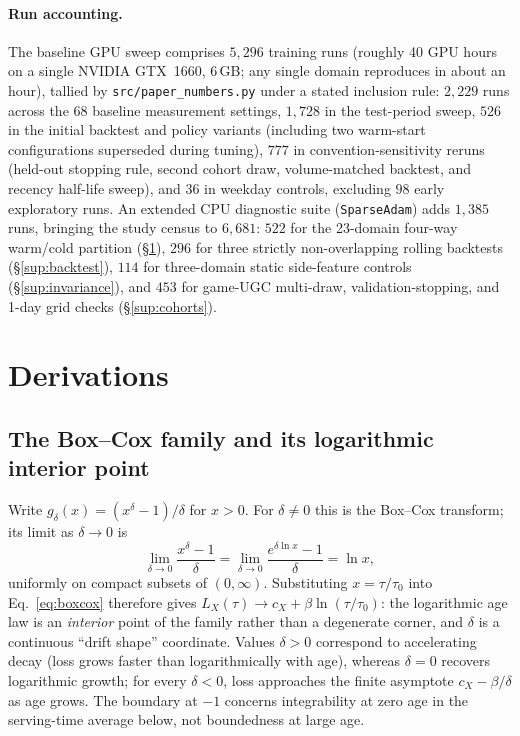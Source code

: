 \documentclass[10pt,letterpaper]{article}
\begin{document}
\paragraph{Run accounting.}
The baseline GPU sweep comprises $5{,}296$ training runs (roughly 40 GPU hours
on a single NVIDIA GTX~1660, 6\,GB; any single domain reproduces in about an hour),
tallied by \texttt{src/paper\_numbers.py} under a stated inclusion rule:
$2{,}229$ runs across the 68 baseline measurement settings, $1{,}728$ in the
test-period sweep, $526$ in the initial backtest and policy variants
(including two warm-start configurations superseded during tuning), $777$
in convention-sensitivity reruns (held-out stopping rule, second
cohort draw, volume-matched backtest, and recency half-life sweep), and $36$ in
weekday controls, excluding $98$ early exploratory runs. An extended CPU
diagnostic suite (\texttt{SparseAdam}) adds $1{,}385$ runs, bringing the study
census to $6{,}681$:
$522$ for the 23-domain four-way warm/cold partition (\S\ref{sup:derivations}),
$296$ for three strictly non-overlapping rolling backtests (\S\ref{sup:backtest}),
$114$ for three-domain static side-feature controls (\S\ref{sup:invariance}), and
$453$ for game-UGC multi-draw, validation-stopping, and 1-day grid checks
(\S\ref{sup:cohorts}).

\section{Derivations}
\label{sup:derivations}

\subsection{The Box--Cox family and its logarithmic interior point}

Write $g_\delta(x) = (x^{\delta} - 1)/\delta$ for $x > 0$. For
$\delta \neq 0$ this is the Box--Cox transform; its limit as
$\delta \to 0$ is
\[
\lim_{\delta \to 0} \frac{x^{\delta} - 1}{\delta}
= \lim_{\delta \to 0} \frac{e^{\delta \ln x} - 1}{\delta}
= \ln x ,
\]
uniformly on compact subsets of $(0, \infty)$. Substituting
$x = \tau/\tau_0$ into Eq.~\eqref{eq:boxcox} therefore gives
$L_X(\tau) \to c_X + \beta \ln(\tau/\tau_0)$: the logarithmic age law is an
\emph{interior} point of the family rather than a degenerate corner, and
$\delta$ is a continuous ``drift shape'' coordinate. Values $\delta > 0$
correspond to accelerating decay (loss grows faster than logarithmically with
age), whereas $\delta = 0$ recovers logarithmic growth; for every $\delta < 0$,
loss approaches the finite asymptote $c_X - \beta/\delta$ as age grows. The
boundary at $-1$ concerns integrability at zero age in the serving-time average
below, not boundedness at large age.
\end{document}
